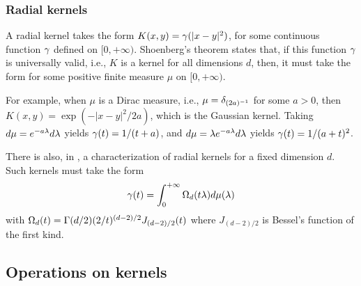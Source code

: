 \subsubsection{Radial kernels}
 A radial kernel takes the form 
 $K(x,y)
= \gamma(|x-y|^2)$, for some continuous function $\gamma$ defined on $[0,
+\infty)$. 
Shoenberg's theorem \citep{schoenberg1938metric} states that, if this function $\gamma$ is
universally valid, i.e., $K$ is a kernel for all dimensions $d$, then, it must take the form
for some positive finite measure $\mu$ on $[0, +\infty)$. 

 For example, when
$\mu$ is a Dirac measure, i.e., $\mu = \delta_{(2a)^{-1}}$ for some $a>0$, then
$K(x,y) = \exp(-|x-y|^2/2a)$, which is the Gaussian kernel.
Taking $d\mu = e^{-a\lambda} d\lambda$ yields $\gamma(t) = 1/(t+a)$, and $d\mu =
\lambda e^{-a\lambda}d\lambda$ yields $\gamma(t) = 1/(a+t)^2$.

There is also, in \citet{schoenberg1938metric}, a characterization of radial
kernels for a fixed dimension $d$. Such kernels must take the form
$$
\gamma(t) = \int_0^{+\infty} \Omega_d(t\lambda) d\mu(\lambda)
$$
with $\Omega_d(t) = \Gamma(d/2) (2/t)^{(d-2)/2} J_{(d-2)/2}(t)$ where $J_{(d-2)/2}$ is Bessel's function of the first kind.


\subsection{Operations on kernels}

